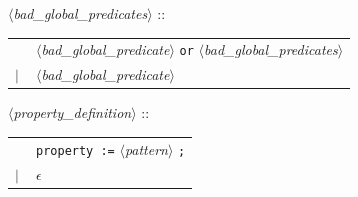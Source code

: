 \documentclass[a4paper,11pt]{report}
\newcommand{\emptystring}{$\epsilon$}
\newcommand{\nt}[1]{$\langle$\emph{#1}$\rangle$}
\newcommand{\regleGrammaire}[1]{\bigskip \noindent \nt{#1} :: \\}
\newcommand{\styleIMI}[1]{\textcolor{imicolor}{\texttt{#1}}}
\begin{document}
\regleGrammaire{bad\_global\_predicates}
\begin{tabular}{l l}
	\  & \nt{bad\_global\_predicate} \styleIMI{or} \nt{bad\_global\_predicates} \\
	$|$ & \nt{bad\_global\_predicate} \\
\end{tabular}


\regleGrammaire{property\_definition}
\begin{tabular}{l l}
	\  & \styleIMI{property :=} \nt{pattern} \styleIMI{;} \\
	$|$ & \emptystring \\
\end{tabular}
\end{document}
